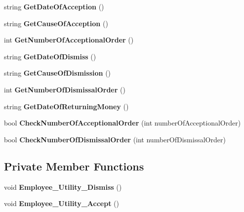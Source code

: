 \begin{DoxyCompactItemize}
string {\bfseries Get\+Date\+Of\+Acception} ()
\item 
\mbox{\label{class_employee_a462e85cd69817614a7c9e030fb806f29}} 
string {\bfseries Get\+Cause\+Of\+Acception} ()
\item 
\mbox{\label{class_employee_a8ad22e912e2e4e336416df20480ceb54}} 
int {\bfseries Get\+Number\+Of\+Acceptional\+Order} ()
\item 
\mbox{\label{class_employee_a9bf98793dad6f452b3b99b353a4a6635}} 
string {\bfseries Get\+Date\+Of\+Dismiss} ()
\item 
\mbox{\label{class_employee_aa7e35077b13efe6cbc362dc7b561b010}} 
string {\bfseries Get\+Cause\+Of\+Dismission} ()
\item 
\mbox{\label{class_employee_a521952ca263ba6ad783c634631070076}} 
int {\bfseries Get\+Number\+Of\+Dismissal\+Order} ()
\item 
\mbox{\label{class_employee_a7782178746f3640942450a0f7271ef60}} 
string {\bfseries Get\+Date\+Of\+Returning\+Money} ()
\item 
\mbox{\label{class_employee_a48638241e63b03873954369b285d1cd9}} 
bool {\bfseries Check\+Number\+Of\+Acceptional\+Order} (int number\+Of\+Acceptional\+Order)
\item 
\mbox{\label{class_employee_ac7bf1d7191d60ada37e85f8d311a254d}} 
bool {\bfseries Check\+Number\+Of\+Dismissal\+Order} (int number\+Of\+Dismissal\+Order)
\end{DoxyCompactItemize}
\subsection*{Private Member Functions}
\begin{DoxyCompactItemize}
\item 
\mbox{\label{class_employee_a6d9c2cbf05d3137a24c322b1525fffa2}} 
void {\bfseries Employee\+\_\+\+Utility\+\_\+\+Dismiss} ()
\item 
\mbox{\label{class_employee_a534f83eb6f2f106f72d802fcae00eb14}} 
void {\bfseries Employee\+\_\+\+Utility\+\_\+\+Accept} ()
\end{DoxyCompactItemize}
